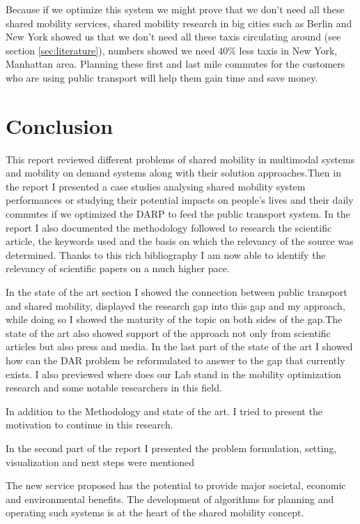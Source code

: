 \documentclass{article}
\begin{document}
Because if we optimize this system we might prove that we don\rq{t} need all these shared mobility services, shared mobility research in big cities such as Berlin and New York showed us that we don\rq{t} need all these
taxis circulating around (see section \ref{sec:literature}), numbers showed we need $40\%$ less taxis in New York, Manhattan area. Planning these first and last mile commutes for the customers who are using public transport will help them gain time and save money.


\section{Conclusion}
\label{sec:conclusion}

This report reviewed different problems of shared mobility in multimodal systems and mobility on demand systems along with their solution approaches.Then in the report I presented a case studies 
analysing shared mobility system performances or studying their potential impacts on people’s lives and their daily commutes if we optimized the DARP to feed the public transport system.
In the report I also documented the methodology followed to research the scientific article, the keywords used and the basis on which the relevancy of the source was determined. Thanks to this rich bibliography I am now able to identify the relevancy of scientific 
papers on a much higher pace.

In the state of the art section I showed the connection between public transport and shared mobility, displayed the research gap into this gap and my approach, while doing so I showed the maturity of the topic on both sides of the gap.The state of the art also showed support of the approach not only from scientific articles but also press and media. In the last part of the state of the art I showed how can the DAR problem be reformulated to answer to the gap that currently exists. I also previewed where does our Lab stand in the mobility optimization research and some notable researchers in this field.

In addition to the Methodology and state of the art. I tried to present the motivation to continue in this research. 

In the second part of the report I presented the problem formulation, setting, visualization and next steps were mentioned  

The new service proposed has the potential to provide major societal, economic and environmental benefits. The development of algorithms for planning and
operating such systems is at the heart of the shared mobility concept. 
\end{document}
